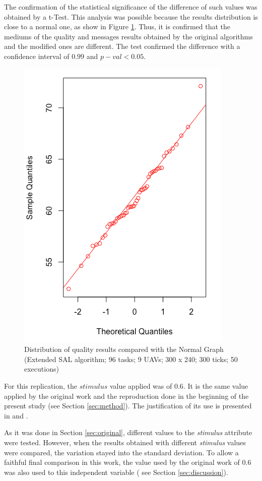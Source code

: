 The confirmation of the statistical significance of the difference of such values was obtained by a t-Test. This analysis was possible because the results distribution is close to a normal one, as show in Figure \ref{fig:fig07}. Thus, it is confirmed that the mediums of the quality and messages results obtained by the original algorithms and the modified ones are different. The test confirmed the difference with a confidence interval of $0.99$ and $p-val<0.05$. 

\begin{figure}[h!]
	\begin{center}
		\includegraphics[scale=0.4]{fig/fig07.png}
		\caption{Distribution of quality results compared with the Normal Graph (Extended SAL algorithm; 96 tasks; 9 UAVs; 300 x 240; 300 ticks; 50 executions)}
		\label{fig:fig07}
	\end{center}
\end{figure}

For this replication, the $stimulus$ value applied was of $0.6$. It is the same value applied by the original work and the reproduction done in the beginning of the present study (see Section \ref{sec:method}). The justification of its use is presented in \cite{MAS07} and \cite{ferreira2007swarm}.

As it was done in Section \ref{sec:original}, different values to the \textit{stimulus} attribute were tested. However, when the results obtained with different \textit{stimulus} values were compared, the variation stayed into the standard deviation. To allow a faithful final comparison in this work, the value used by the original work \cite{MAS07} of $0.6$ was also used to this independent variable ( see Section \ref{sec:discussion}).
